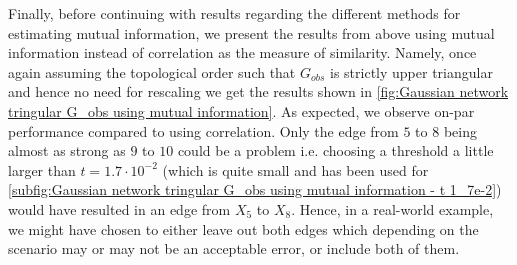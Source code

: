 \documentclass[../Thesis.tex]{subfiles}
\begin{document}
Finally, before continuing with results regarding the different methods for estimating mutual information, we present the results from above using mutual information instead of correlation as the measure of similarity. Namely, once again assuming the topological order such that $G_{obs}$ is strictly upper triangular and hence no need for rescaling we get the results shown in \autoref{fig:Gaussian network tringular G_obs using mutual information}. As expected, we observe on-par performance compared to using correlation. Only the edge from $5$ to $8$ being almost as strong as $9$ to $10$ could be a problem i.e. choosing a threshold a little larger than $t = 1.7 \cdot 10^{-2}$ (which is quite small and has been used for \autoref{subfig:Gaussian network tringular G_obs using mutual information - t 1_7e-2}) would have resulted in an edge from $X_5$ to $X_8$. Hence, in a real-world example, we might have chosen to either leave out both edges which depending on the scenario may or may not be an acceptable error, or include both of them.
\end{document}
